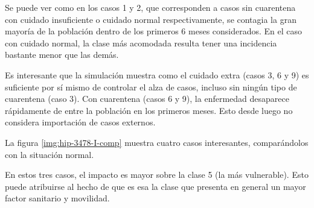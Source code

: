 Se puede ver como en los casos 1 y 2, que corresponden a casos sin cuarentena con cuidado insuficiente o cuidado normal respectivamente, se contagia la gran mayoría de la población dentro de los primeros 6 meses considerados. En el caso con cuidado normal, la clase más acomodada resulta tener una incidencia bastante menor que las demás.

Es interesante que la simulación muestra como el cuidado extra (casos 3, 6 y 9) es suficiente por sí mismo de controlar el alza de casos, incluso sin ningún tipo de cuarentena (caso 3). Con cuarentena (casos 6 y 9), la enfermedad desaparece rápidamente de entre la población en los primeros meses. Esto desde luego no considera importación de casos externos.



La figura \ref{img:hip-3478-I-comp} muestra cuatro casos interesantes, comparándolos con la situación normal. 




En estos tres casos, el impacto es mayor sobre la clase 5 (la más vulnerable). Esto puede atribuirse al hecho de que es esa la clase que presenta en general un mayor factor sanitario y movilidad.
 
 


